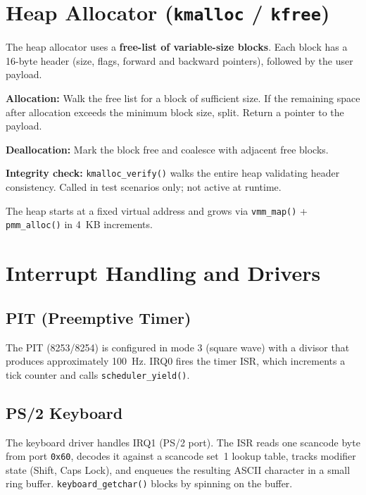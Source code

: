 \documentclass[12pt,a4paper]{article}
\begin{document}
\section{Heap Allocator (\texttt{kmalloc} / \texttt{kfree})}

The heap allocator uses a \textbf{free-list of variable-size blocks}. Each block has a 16-byte header (size, flags, forward and backward pointers), followed by the user payload.

\textbf{Allocation:} Walk the free list for a block of sufficient size. If the remaining space after allocation exceeds the minimum block size, split. Return a pointer to the payload.

\textbf{Deallocation:} Mark the block free and coalesce with adjacent free blocks.

\textbf{Integrity check:} \texttt{kmalloc\_verify()} walks the entire heap validating header consistency. Called in test scenarios only; not active at runtime.

The heap starts at a fixed virtual address and grows via \texttt{vmm\_map()} + \texttt{pmm\_alloc()} in 4~KB increments.

\section{Interrupt Handling and Drivers}

\subsection{PIT (Preemptive Timer)}

The PIT (8253/8254) is configured in mode 3 (square wave) with a divisor that produces approximately 100~Hz. IRQ0 fires the timer ISR, which increments a tick counter and calls \texttt{scheduler\_yield()}.

\subsection{PS/2 Keyboard}

The keyboard driver handles IRQ1 (PS/2 port). The ISR reads one scancode byte from port \texttt{0x60}, decodes it against a scancode set~1 lookup table, tracks modifier state (Shift, Caps Lock), and enqueues the resulting ASCII character in a small ring buffer. \texttt{keyboard\_getchar()} blocks by spinning on the buffer.
\end{document}
